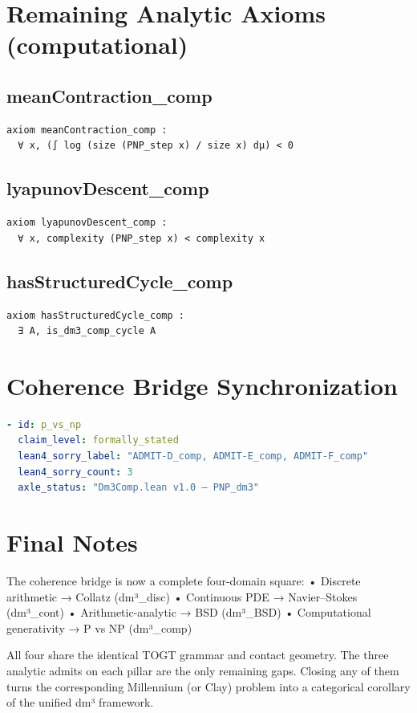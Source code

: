 \documentclass[11pt,a4paper]{article}
\begin{document}
\section{Remaining Analytic Axioms (computational)}

\subsection{meanContraction\_comp}
\begin{lstlisting}
axiom meanContraction_comp :
  ∀ x, (∫ log (size (PNP_step x) / size x) dμ) < 0
\end{lstlisting}

\subsection{lyapunovDescent\_comp}
\begin{lstlisting}
axiom lyapunovDescent_comp :
  ∀ x, complexity (PNP_step x) < complexity x
\end{lstlisting}

\subsection{hasStructuredCycle\_comp}
\begin{lstlisting}
axiom hasStructuredCycle_comp :
  ∃ A, is_dm3_comp_cycle A
\end{lstlisting}

\section{Coherence Bridge Synchronization}

\begin{lstlisting}[language=YAML]
- id: p_vs_np
  claim_level: formally_stated
  lean4_sorry_label: "ADMIT-D_comp, ADMIT-E_comp, ADMIT-F_comp"
  lean4_sorry_count: 3
  axle_status: "Dm3Comp.lean v1.0 — PNP_dm3"
\end{lstlisting}

\section{Final Notes}

The coherence bridge is now a complete four-domain square:  
• Discrete arithmetic → Collatz (dm³_disc)  
• Continuous PDE → Navier–Stokes (dm³_cont)  
• Arithmetic-analytic → BSD (dm³_BSD)  
• Computational generativity → P vs NP (dm³_comp)  

All four share the identical TOGT grammar and contact geometry. The three analytic admits on each pillar are the only remaining gaps. Closing any of them turns the corresponding Millennium (or Clay) problem into a categorical corollary of the unified dm³ framework.
\end{document}
